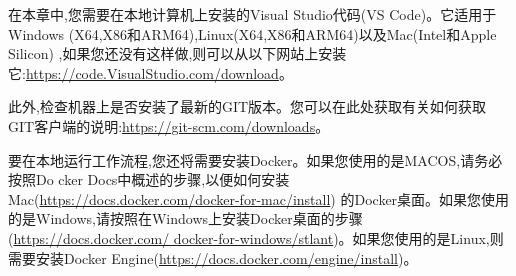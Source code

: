 在本章中,您需要在本地计算机上安装的Visual Studio代码(VS Code)。它适用于Windows (X64,X86和ARM64),Linux(X64,X86和ARM64)以及Mac(Intel和Apple Silicon) ,如果您还没有这样做,则可以从以下网站上安装它:\url{https://code.VisualStudio.com/download}。

此外,检查机器上是否安装了最新的GIT版本。您可以在此处获取有关如何获取GIT客户端的说明:\url{https://git-scm.com/downloads}。

要在本地运行工作流程,您还将需要安装Docker。如果您使用的是MACOS,请务必按照Do cker Docs中概述的步骤,以便如何安装Mac(\url{https://docs.docker.com/docker-for-mac/install}) 的Docker桌面。如果您使用的是Windows,请按照在Windows上安装Docker桌面的步骤(\url{https://docs.docker.com/ docker-for-windows/stlant})。如果您使用的是Linux,则需要安装Docker Engine(\url{https://docs.docker.com/engine/install})。




